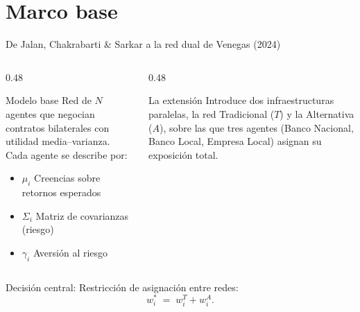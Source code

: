 \documentclass[xcolor=dvipsnames]{beamer}
\begin{document}
\section{Marco base}
\begin{frame}{De Jalan, Chakrabarti \& Sarkar a la red dual de Venegas (2024)}
\begin{columns}[T]
  \begin{column}{0.48\textwidth}
    \begin{block}{Modelo base \citep{jalan_chakrabarti_2024}}
      Red de $N$ agentes que negocian contratos bilaterales con utilidad
      media–varianza. Cada agente se describe por:
      \begin{itemize}
        \item $\mu_i$  Creencias sobre retornos esperados
        \item $\Sigma_i$  Matriz de covarianzas (riesgo)
        \item $\gamma_i$  Aversión al riesgo
      \end{itemize}
    \end{block}
  \end{column}
  \begin{column}{0.48\textwidth}
    \begin{block}{La extensión \citep{venegas_2024}}
      Introduce dos infraestructuras paralelas, la red Tradicional ($T$) y
      la Alternativa ($A$), sobre las que tres agentes (Banco Nacional,
      Banco Local, Empresa Local) asignan su exposición total.
    \end{block}
  \end{column}
\end{columns}
\vfill
\begin{center}
  Decisión central: Restricción de asignación entre redes:
  \[ w_i^{*} \;=\; w_i^{T} + w_i^{A}. \]
\end{center}
\end{frame}


\end{document}
